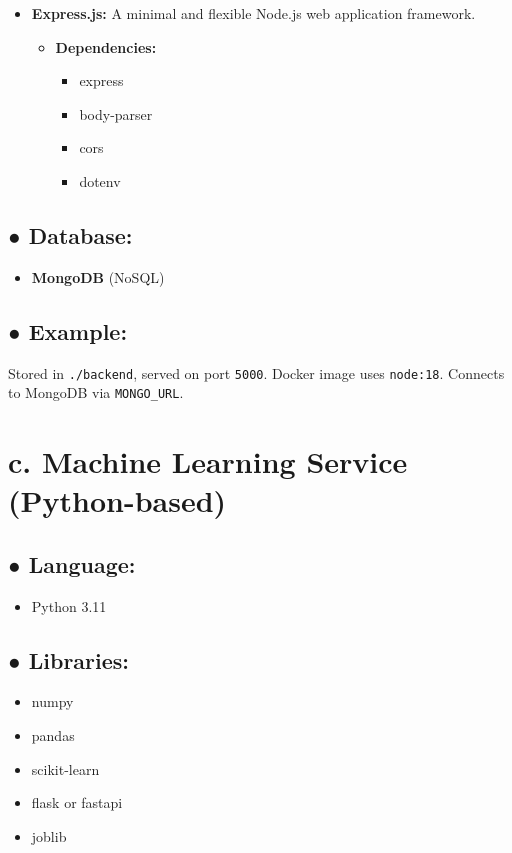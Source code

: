\documentclass[12pt]{article}
\begin{document}
\begin{itemize}
  \item \textbf{Express.js:} A minimal and flexible Node.js web application framework.
  \begin{itemize}
    \item \textbf{Dependencies:}
    \begin{itemize}
      \item express
      \item body-parser
      \item cors
      \item dotenv
    \end{itemize}
  \end{itemize}
\end{itemize}

\subsection*{● Database:}
\begin{itemize}
  \item \textbf{MongoDB} (NoSQL)
\end{itemize}

\subsection*{● Example:}
Stored in \texttt{./backend}, served on port \texttt{5000}. Docker image uses \texttt{node:18}. Connects to MongoDB via \texttt{MONGO\_URL}.

\section*{c. Machine Learning Service (Python-based)}

\subsection*{● Language:}
\begin{itemize}
  \item Python 3.11
\end{itemize}

\subsection*{● Libraries:}
\begin{itemize}
  \item numpy
  \item pandas
  \item scikit-learn
  \item flask or fastapi
  \item joblib
\end{itemize}
\end{document}
